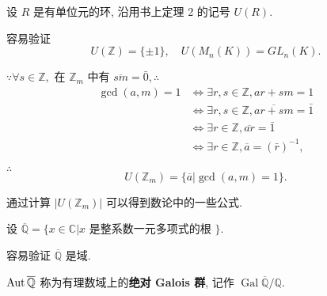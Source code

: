 \documentclass[color=black,device=normal,lang=cn,mode=geye]{elegantnote}
\begin{document}
\begin{example}
    设 $R$ 是有单位元的环, 沿用书上定理 2 的记号 $U(R)$.

    容易验证
    \[U(\mathbb{Z})=\{\pm1\},\quad U(M_n(K))= GL _n(K).\]

    $\because\forall s\in\mathbb{Z},$ 在 $\mathbb{Z}_m$ 中有 $\overline{sm}=\bar{0},\therefore$
    \begin{align*}
        \gcd(a,m)=1 & \Leftrightarrow\exists r,s\in\mathbb{Z},ar+sm=1 \\
        & \Leftrightarrow\exists r,s\in\mathbb{Z},\overline{ar+sm}=\bar{1} \\
        & \Leftrightarrow\exists r\in\mathbb{Z},\overline{ar}=\bar{1} \\
        & \Leftrightarrow\exists r\in\mathbb{Z},\overline{a}=(\bar{r})^{-1},
    \end{align*}

    $\therefore$
    \[U(\mathbb{Z}_m)=\{\overline{a}|\gcd(a,m)=1\}.\]

    通过计算 $|U(\mathbb{Z}_m)|$ 可以得到数论中的一些公式.
\end{example}
\begin{example}
    设 $\overline{\mathbb{Q}}=\{x\in\mathbb{C}|x$ 是整系数一元多项式的根 $\}$.

    容易验证 $\overline{\mathbb{Q}}$ 是域.

    $\operatorname{Aut}\overline{\mathbb{Q}}$ 称为有理数域上的\textbf{绝对 Galois 群}, 记作 $\operatorname{Gal}\overline{\mathbb{Q}}/\mathbb{Q}$.
\end{example}
\end{document}
